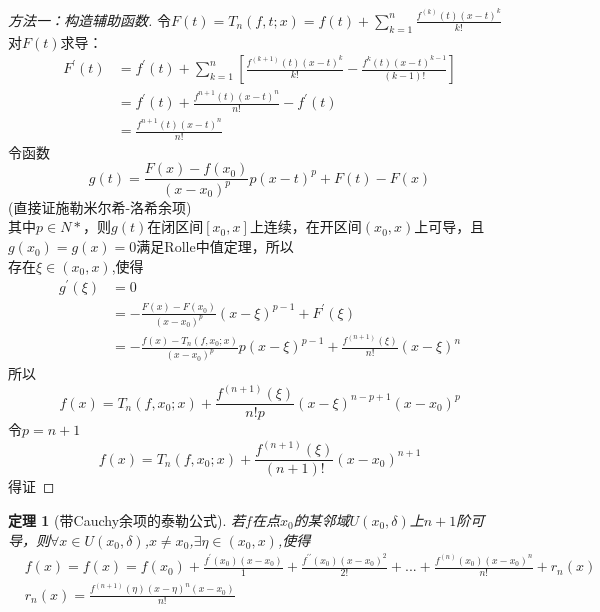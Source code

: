 \documentclass[12pt, a4paper, oneside]{ctexart}
\newtheorem{theorem}{定理}[section]
\begin{document}
\begin{proof}[方法一：构造辅助函数]%
令$F(t)=T_n(f,t;x)=f(t)+\sum_{k=1}^{n}\frac{f^{(k)}(t)(x-t)^{k}}{k!}$\\
对$F(t)$求导：
\begin{equation}
    \begin{aligned}
        F^{\prime}(t)&=f^{\prime}(t)+\sum_{k=1}^{n}[\frac{f^{(k+1)}(t)(x-t)^{k}}{k!}-\frac{f^{k}(t)(x-t)^{k-1}}{(k-1)!}]\\
        &=f^{\prime}(t)+\frac{f^{n+1}(t)(x-t)^{n}}{n!}-f^{\prime}(t)\\
        &=\frac{f^{n+1}(t)(x-t)^{n}}{n!}
    \end{aligned}
\end{equation}
令函数
\begin{equation}
    g(t)=\frac{F(x)-f(x_0)}{(x-x_0)^{p}}p(x-t)^{p}+F(t)-F(x)
\end{equation}
(直接证施勒米尔希-洛希余项)\\
其中$p \in N*$，则$g(t)$在闭区间$[x_0,x]$上连续，在开区间$(x_0,x)$上可导，且$g(x_0)=g(x)=0$满足Rolle中值定理，所以\\
存在$\xi \in (x_0,x)$,使得
\begin{equation}
   \begin{aligned}
        g^{\prime}(\xi)&=0\\
        &=-\frac{F(x)-F(x_0)}{(x-x_0)^{p}}(x-\xi)^{p-1}+F^{\prime}(\xi)\\
        &=-\frac{f(x)-T_n(f,x_0;x)}{(x-x_0)^{p}}p(x-\xi)^{p-1}+\frac{f^{(n+1)}(\xi)}{n!}(x-\xi)^{n}
   \end{aligned}
\end{equation}
所以
\begin{equation}
    f(x)=T_n(f,x_0;x)+\frac{f^{(n+1)}(\xi)}{n!p}(x-\xi)^{n-p+1}(x-x_0)^{p}
\end{equation}
令$p=n+1$ 
\begin{equation}
   f(x)=T_n(f,x_0;x)+\frac{f^{(n+1)}(\xi)}{(n+1)!}(x-x_0)^{n+1}
\end{equation}
得证
\end{proof}

\begin{theorem}[带Cauchy余项的泰勒公式]
若$f$在点$x_0$的某邻域$U(x_0,\delta)$上$n+1$阶可导，则$\forall x \in U(x_0,\delta)$,$x \neq x_0$,$  \exists \eta \in (x_0,x)$,使得
\begin{equation}
\begin{aligned}
    & f(x)=  f(x)=f(x_0)+\frac{f^{\prime}(x_0)(x-x_0)}{1\!}+\frac{f^{\prime \prime}(x_0)(x-x_0)^{2}}{2!}+...+\frac{f^{(n)}(x_0)(x-x_0)^{n}}{n!}+r_n(x)\\
    & r_n(x)=\frac{f^{(n+1)}(\eta)(x-\eta)^{n}(x-x_0)}{n!}
\end{aligned}
\end{equation}
\end{theorem}
\end{document}
